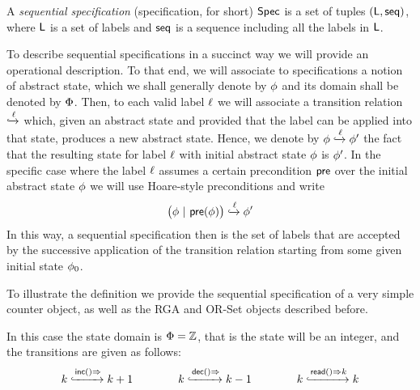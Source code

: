 
\begin{definition}
  \label{definition:sequential specification} A \emph{sequential
  specification} (specification, for short) $\Spec$ is a set of tuples $(\alabelset, \aseqord)$, where
  $\alabelset$ is a set of labels and
  $\aseqord$ is a sequence including all the labels in $\alabelset$.
\end{definition}

To describe sequential specifications in a succinct way we will
provide an operational description.
To that end, we will associate to specifications a notion of abstract
state, which we shall generally denote by $\abstate$ and its domain
shall be denoted by $\abstates$.
Then, to each valid label $\alabel$ we will associate a transition
relation \;$\specarrow{\alabel}$\; which, given an abstract state and
provided that the label can be applied into that state, produces a new
abstract state.
Hence, we denote by $\abstate \specarrow{\alabel}  \abstate'$
the fact that the resulting state for label $\alabel$ with initial
abstract state $\abstate$ is $\abstate'$.
%
In the specific case where the label $\alabel$ assumes a certain
precondition $\apre$ over the initial abstract state $\abstate$ we
will use Hoare-style preconditions and write
\[ \big(\abstate\ |\ \apre(\abstate)\big) \specarrow{\alabel}
  \abstate' \] In this way, a sequential specification then is the set
of labels that are accepted by the successive application of the
transition relation starting from some given initial state
$\abstate_{0}$.

To illustrate the definition we provide the sequential specification
of a very simple counter object, as well as the RGA and OR-Set objects
described before.
\begin{example}
  \label{definition:sequential specification of counter} In this case
  the state domain is $\abstates = \mathbb{Z}$, that is the state will
  be an integer, and the transitions are given as follows:
\[
  k \specarrow{\alabellong[\mathsf{inc}]{}{}} k+1\qquad\qquad
  k \specarrow{\alabellong[\mathsf{dec}]{}{}} k-1\qquad\qquad
  k \specarrow{\alabellong[\mathsf{read}]{}{k}} k
\]
\end{example}

